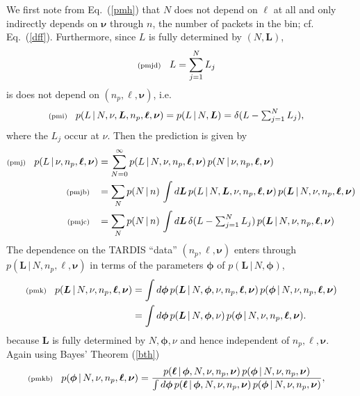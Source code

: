 \documentclass[11pt]{article}
\newcommand{\lleq}[1]{\label{#1} }
\renewcommand{\lleq}[1]{\label{#1} {\scriptstyle {\rm (#1)}} \hspace*{2ex} }
\newcommand{\cond}{\,|\,}
\newcommand{\bml}{{\bm{\ell}}}
\newcommand{\bmL}{{\bm{L}}}
\newcommand{\bmphi}{{\bm{\phi}}}
\newcommand{\bmnu}{{\bm{\nu}}}
\newcommand{\refeq}[1]{Eq.~(\ref{#1})}
\newcommand{\npack}{n_p}
\begin{document}
We first note from \refeq{pmh} that $N$ does not depend on $\bml$ at
all and only indirectly depends on $\bmnu$ through $n$, the number of
packets in the bin; cf. \refeq{dff}. Furthermore, since $L$ is fully
determined by $(N,\bmL)$,
\begin{align}
  \lleq{pmjd}
  L &= \sum_{j=1}^N L_j
\end{align}
is does not depend on $(\npack,\bml,\bmnu)$, i.e.\
\begin{align}
  \lleq{pmi}
  p(L\cond N,\nu,\bmL,\npack,\bml, \bmnu)
  = p(L\cond N, \bmL)
  &= \delta(L - \textstyle\sum_{j=1}^N L_j),
\end{align}
where the $L_j$ occur at $\nu$.
Then the prediction is given by
\begin{align}
  \lleq{pmj}
  p(L\cond \nu, \npack,\bml, \bmnu)
  &= \sum_{N=0}^\infty p(L\cond N,\nu, \npack,\bml, \bmnu)\,p(N\cond \nu, \npack,\bml, \bmnu) \\
  \lleq{pmjb}
  &= \sum_N p(N\cond n)\,\int d\bmL\, p(L\cond N,\bmL,\nu, \npack,\bml, \bmnu)\, p(\bmL\cond N,\nu, \npack,\bml, \bmnu)
  \\
  \lleq{pmjc}
  &= \sum_N p(N\cond n)\,\int d\bmL\,\delta(L - \textstyle\sum_{j=1}^N L_j)
  \, p(\bmL\cond N,\nu, \npack,\bml, \bmnu)
\end{align}
The dependence on the TARDIS ``data'' $(\npack,\bml, \bmnu)$ enters
through $p(\bmL\cond N,\npack,\bml, \bmnu)$ in terms of the parameters
$\bmphi$ of $p(\bmL\cond N,\bmphi)$,
\begin{align}
  \lleq{pmk}
  p(\bmL\cond N,\nu, \npack,\bml, \bmnu)
  &= \int d\bmphi\, p(\bmL\cond N,\bmphi,\nu, \npack,\bml, \bmnu)\,p(\bmphi\cond N,\nu, \npack,\bml, \bmnu) \\
  &= \int d\bmphi\, p(\bmL\cond N,\bmphi, \nu)\,p(\bmphi\cond N,\nu, \npack,\bml, \bmnu).
\end{align}
because $\bmL$ is fully determined by $N,\bmphi, \nu$ and hence independent
of $\npack,\bml, \bmnu$.
%
Again using Bayes' Theorem (\ref{bth})
\begin{align}
  \lleq{pmkb}
  p(\bmphi\cond N,\nu, \npack,\bml, \bmnu) &=
  \frac{p(\bml\cond \bmphi, N,\nu, \npack,\bmnu)\,p(\bmphi\cond N,\nu, \npack,\bmnu)} %
  {\int d\bmphi\,p(\bml\cond \bmphi,N,\nu, \npack,\bmnu)\,p(\bmphi\cond N,\nu, \npack,\bmnu)}, %
\end{align}
\end{document}
